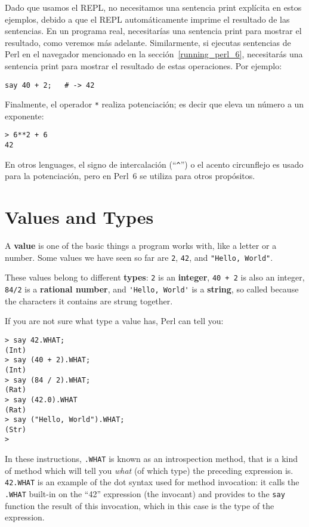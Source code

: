 Dado que usamos el REPL, no necesitamos una sentencia print explícita
en estos ejemplos, debido a que el REPL automáticamente imprime el resultado de las sentencias. En un programa real, necesitarías una sentencia print para mostrar el resultado, como veremos más adelante. Similarmente, si ejecutas sentencias de Perl en el navegador mencionado en la sección~\ref{running_perl_6}, necesitarás una sentencia print para mostrar el resultado de estas operaciones.
Por ejemplo:

\begin{verbatim}
say 40 + 2;   # -> 42
\end{verbatim}


Finalmente, el operador {\tt **} realiza potenciación; es decir que eleva un número a un exponente:

\begin{verbatim}
> 6**2 + 6
42
\end{verbatim}
%
En otros lenguages, el signo de intercalación (``\verb"^"'') o el acento circunflejo es usado para la potenciación, pero en Perl~6 se utiliza para otros propósitos.
%


\section{Values and Types}
\label{values_and_types}

A {\bf value} is one of the basic things a program works with, like a
letter or a number.  Some values we have seen so far are {\tt 2},
{\tt 42}, and \verb'"Hello, World"'.

These values belong to different {\bf types}:
{\tt 2} is an {\bf integer}, {\tt 40 + 2} is also an integer, 
{\tt 84/2} is a {\bf rational number},
and \verb"'Hello, World'" is a {\bf string}, so called 
because the characters it contains are strung together.

If you are not sure what type a value has, Perl can
tell you:

\begin{verbatim}
> say 42.WHAT;
(Int)
> say (40 + 2).WHAT;
(Int)
> say (84 / 2).WHAT;
(Rat)
> say (42.0).WHAT
(Rat)
> say ("Hello, World").WHAT;
(Str)
>
\end{verbatim}
%
In these instructions, {\tt .WHAT} is known as an 
introspection method, that is a kind of method which 
will tell you \emph{what} (of  which type) the preceding 
expression is. {\tt 42.WHAT} is an example of the dot 
syntax used for method invocation: it calls the {\tt .WHAT} 
built-in on the ``42'' expression (the invocant) and provides 
to the {\tt say} function the result of this invocation, 
which in this case is the type of the expression.

